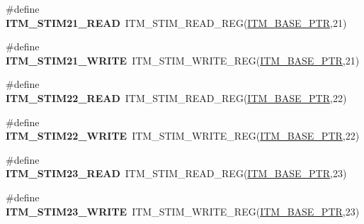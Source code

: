 \begin{DoxyCompactItemize}
\item 
\hypertarget{group___i_t_m___register___accessor___macros_ga5e2870c6c2d38a75f0477a1030fc60aa}{}\#define {\bfseries I\+T\+M\+\_\+\+S\+T\+I\+M21\+\_\+\+R\+E\+A\+D}~I\+T\+M\+\_\+\+S\+T\+I\+M\+\_\+\+R\+E\+A\+D\+\_\+\+R\+E\+G(\hyperlink{group___i_t_m___peripheral_gafaddee8fe8b6a898d4e5edc43ee0d703}{I\+T\+M\+\_\+\+B\+A\+S\+E\+\_\+\+P\+T\+R},21)\label{group___i_t_m___register___accessor___macros_ga5e2870c6c2d38a75f0477a1030fc60aa}

\item 
\hypertarget{group___i_t_m___register___accessor___macros_gac7f186c8addcf22a51326064a6775a33}{}\#define {\bfseries I\+T\+M\+\_\+\+S\+T\+I\+M21\+\_\+\+W\+R\+I\+T\+E}~I\+T\+M\+\_\+\+S\+T\+I\+M\+\_\+\+W\+R\+I\+T\+E\+\_\+\+R\+E\+G(\hyperlink{group___i_t_m___peripheral_gafaddee8fe8b6a898d4e5edc43ee0d703}{I\+T\+M\+\_\+\+B\+A\+S\+E\+\_\+\+P\+T\+R},21)\label{group___i_t_m___register___accessor___macros_gac7f186c8addcf22a51326064a6775a33}

\item 
\hypertarget{group___i_t_m___register___accessor___macros_ga65cc639289ac0f598f937c573ed5abde}{}\#define {\bfseries I\+T\+M\+\_\+\+S\+T\+I\+M22\+\_\+\+R\+E\+A\+D}~I\+T\+M\+\_\+\+S\+T\+I\+M\+\_\+\+R\+E\+A\+D\+\_\+\+R\+E\+G(\hyperlink{group___i_t_m___peripheral_gafaddee8fe8b6a898d4e5edc43ee0d703}{I\+T\+M\+\_\+\+B\+A\+S\+E\+\_\+\+P\+T\+R},22)\label{group___i_t_m___register___accessor___macros_ga65cc639289ac0f598f937c573ed5abde}

\item 
\hypertarget{group___i_t_m___register___accessor___macros_ga7733147e8939d83fbea163a3d3c181d4}{}\#define {\bfseries I\+T\+M\+\_\+\+S\+T\+I\+M22\+\_\+\+W\+R\+I\+T\+E}~I\+T\+M\+\_\+\+S\+T\+I\+M\+\_\+\+W\+R\+I\+T\+E\+\_\+\+R\+E\+G(\hyperlink{group___i_t_m___peripheral_gafaddee8fe8b6a898d4e5edc43ee0d703}{I\+T\+M\+\_\+\+B\+A\+S\+E\+\_\+\+P\+T\+R},22)\label{group___i_t_m___register___accessor___macros_ga7733147e8939d83fbea163a3d3c181d4}

\item 
\hypertarget{group___i_t_m___register___accessor___macros_gaa2155b2b5a6c7d6a8a3cc643a4bd4af6}{}\#define {\bfseries I\+T\+M\+\_\+\+S\+T\+I\+M23\+\_\+\+R\+E\+A\+D}~I\+T\+M\+\_\+\+S\+T\+I\+M\+\_\+\+R\+E\+A\+D\+\_\+\+R\+E\+G(\hyperlink{group___i_t_m___peripheral_gafaddee8fe8b6a898d4e5edc43ee0d703}{I\+T\+M\+\_\+\+B\+A\+S\+E\+\_\+\+P\+T\+R},23)\label{group___i_t_m___register___accessor___macros_gaa2155b2b5a6c7d6a8a3cc643a4bd4af6}

\item 
\hypertarget{group___i_t_m___register___accessor___macros_gaca71beb45d1448267f6f0f4ae952ce42}{}\#define {\bfseries I\+T\+M\+\_\+\+S\+T\+I\+M23\+\_\+\+W\+R\+I\+T\+E}~I\+T\+M\+\_\+\+S\+T\+I\+M\+\_\+\+W\+R\+I\+T\+E\+\_\+\+R\+E\+G(\hyperlink{group___i_t_m___peripheral_gafaddee8fe8b6a898d4e5edc43ee0d703}{I\+T\+M\+\_\+\+B\+A\+S\+E\+\_\+\+P\+T\+R},23)\label{group___i_t_m___register___accessor___macros_gaca71beb45d1448267f6f0f4ae952ce42}


\end{DoxyCompactItemize}
